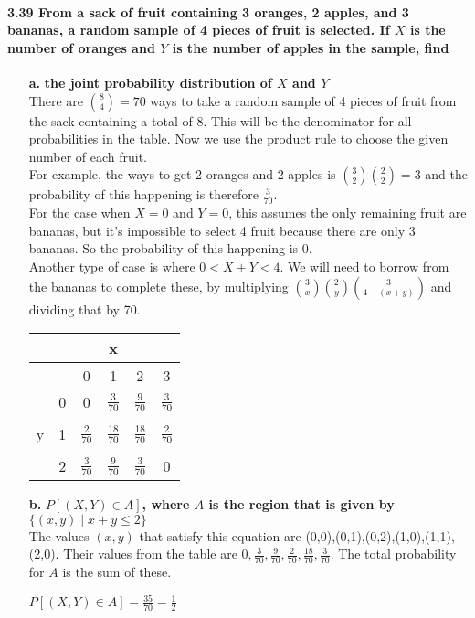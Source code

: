 \documentclass{article}
\begin{document}
\paragraph{3.39 From a sack of fruit containing 3 oranges, 2 apples, and 
3 bananas, a random sample of 4 pieces of fruit is selected. If $X$ is the 
number of oranges and $Y$ is the number of apples in the sample, find}
\begin{enumerate}
\item[\textbf{a.}] \textbf{the joint probability distribution of $X$ and 
$Y$}\\
There are ${8 \choose 4} = 70$ ways to take a random sample of 4 pieces of 
fruit from the sack containing a total of 8. This will be the denominator
for all probabilities in the table. Now we use the product rule to choose
the given number of each fruit.\\
For example, the ways to get 2 oranges and 2 apples is 
${3 \choose 2}{2 \choose 2} = 3$ and the probability of this happening is
therefore $\frac{3}{70}$.\\
For the case when $X=0$ and $Y=0$, this assumes the only remaining fruit
are bananas, but it's impossible to select 4 fruit because there are only
3 bananas. So the probability of this happening is 0.\\
Another type of case is where $0<X+Y<4$. We will need to borrow from the
bananas to complete these, by multiplying ${3 \choose x}{2 \choose y}
{3 \choose 4-(x+y)}$ and dividing that by 70.
\begin{center}
\begin{tabular}{|c|c|c c c c|}
\hline
   & & & x & &\\
\hline
   &   & 0 & 1 & 2 & 3\\
\hline
   & 0 & 0 & $\frac{3}{70}$ & $\frac{9}{70}$ & $\frac{3}{70}$\\
   &&&&&\\
 y & 1 & $\frac{2}{70}$ & $\frac{18}{70}$ & $\frac{18}{70}$ & $\frac{2}{70}$\\
   &&&&&\\
   & 2 & $\frac{3}{70}$ & $\frac{9}{70}$ & $\frac{3}{70}$ & 0\\
\hline
\end{tabular}
\end{center}

\pagebreak
\item[\textbf{b.}] \textbf{$P[(X,Y) \in A]$, where $A$ is the region that
is given by $\{(x,y) \mid x+y \leq 2\}$}\\
The values $(x,y)$ that satisfy this equation are 
(0,0),(0,1),(0,2),(1,0),(1,1),(2,0). 
Their values from the table are 
$0,\frac{3}{70},\frac{9}{70},\frac{2}{70},\frac{18}{70},\frac{3}{70}$.
The total probability for $A$ is the sum of these.
\begin{center}
$P[(X,Y) \in A] = \frac{35}{70} = \frac{1}{2}$
\end{center}
\end{enumerate}
\end{document}
